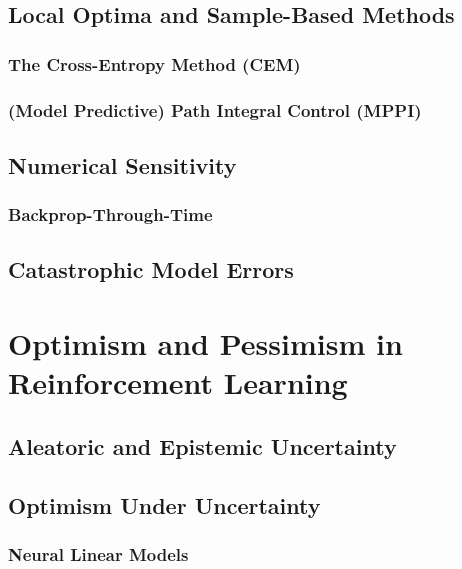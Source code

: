 		\subsection{Local Optima and Sample-Based Methods} %

			\subsubsection{The Cross-Entropy Method (CEM)} %

			\subsubsection{(Model Predictive) Path Integral Control (MPPI)} %

		\subsection{Numerical Sensitivity} %

			\subsubsection{Backprop-Through-Time} %

		\subsection{Catastrophic Model Errors} %

	\section{Optimism and Pessimism in Reinforcement Learning} %

		\subsection{Aleatoric and Epistemic Uncertainty} %

		\subsection{Optimism Under Uncertainty} %

			\subsubsection{Neural Linear Models} %

